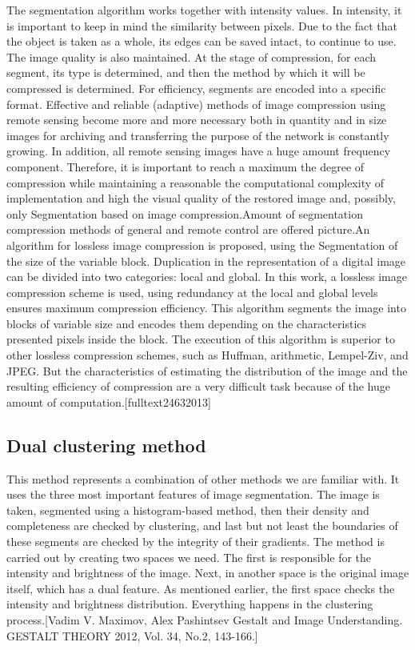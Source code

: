 \par The segmentation algorithm works together with intensity values. In intensity, it is important to keep in mind the similarity between pixels. Due to the fact that the object is taken as a whole, its edges can be saved intact, to continue to use. The image quality is also maintained. At the stage of compression, for each segment, its type is determined, and then the method by which it will be compressed is determined. For efficiency, segments are encoded into a specific format.
Effective and reliable (adaptive) methods of image compression using remote sensing become more and more necessary both in quantity and in size images for archiving and transferring the purpose of the network is constantly growing. In addition, all remote sensing images have a huge amount frequency component. Therefore, it is important to reach a maximum the degree of compression while maintaining a reasonable the computational complexity of implementation and high the visual quality of the restored image and, possibly, only Segmentation based on image compression.Amount of segmentation compression methods of general and remote control are offered picture.An algorithm for lossless image compression is proposed, using the Segmentation of the size of the variable block. Duplication in the representation of a digital image can be divided into two categories: local and global. In this work, a lossless image compression scheme is used, using redundancy at the local and global levels ensures maximum compression efficiency. This algorithm segments the image into blocks of variable size and encodes them depending on the characteristics presented pixels inside the block. The execution of this algorithm is superior to other lossless compression schemes, such as Huffman, arithmetic, Lempel-Ziv, and JPEG. But the characteristics of estimating the distribution of the image and the resulting efficiency of compression are a very difficult task because of the huge amount of computation.[fulltext24632013]


\subsection{Dual clustering method}\label{sec:3.4.6}
\par This method represents a combination of other methods we are familiar with. It uses the three most important features of image segmentation. The image is taken, segmented using a histogram-based method, then their density and completeness are checked by clustering, and last but not least the boundaries of these segments are checked by the integrity of their gradients. The method is carried out by creating two spaces we need. The first is responsible for the intensity and brightness of the image. Next, in another space is the original image itself, which has a dual feature. As mentioned earlier, the first space checks the intensity and brightness distribution. Everything happens in the clustering process.[Vadim V. Maximov, Alex Pashintsev Gestalt and Image Understanding. GESTALT THEORY 2012, Vol. 34, No.2, 143-166.]


